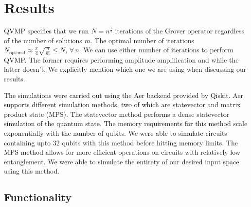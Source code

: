 \documentclass[11pt]{article}
\theoremstyle{definition}
\theoremstyle{remark}
\begin{document}
\section{Results} \label{sec:results}

QVMP specifies that we run $N = n^{\frac{1}{4}}$
iterations of the Grover operator regardless of the number of solutions $m$. The
optimal number of iterations $N_{\text{optimal}} \approx
\frac{\pi}{4}\sqrt{\frac{n}{m}} \leq N,\, \forall \, n$. We can use either
number of iterations to perform QVMP. The former requires performing amplitude
amplification and while the latter doesn't. We explicitly mention which one we
are using when discussing our results.

The simulations were carried out using the Aer backend provided by Qiskit. Aer
supports different simulation methods, two of which are statevector and matrix
product state (MPS). The statevector method performs a dense statevector
simulation of the quantum state. The memory requirements for this method scale
exponentially with the number of qubits. We were able to simulate circuits
containing upto 32 qubits with this method before hitting memory limits. The MPS
method allows for more efficient operations on circuits with relatively low
entanglement. We were able to simulate the entirety of our desired input space
using this method.

\subsection{Functionality}
\end{document}
